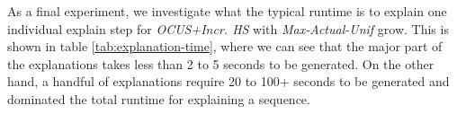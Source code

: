 As a final experiment, we investigate what the typical runtime is to explain one individual explain step for \emph{OCUS+Incr. HS} with \emph{Max-Actual-Unif} grow. 
This is shown in table \ref{tab:explanation-time}, where we can see that the major part of the explanations takes less than 2 to 5 seconds to be generated. On the other hand, a handful of explanations require 20 to 100+ seconds to be generated and dominated the total runtime for explaining a sequence. %




  

